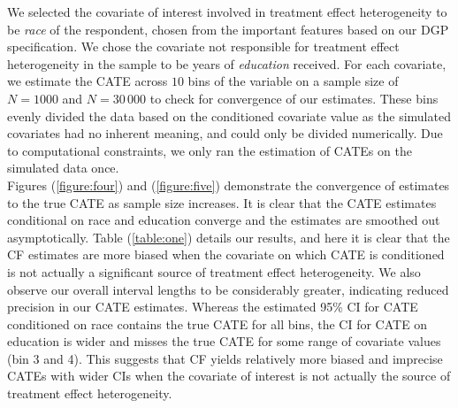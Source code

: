 \documentclass[12pt]{article}
\begin{document}
We selected the covariate of interest involved in treatment effect heterogeneity
to be \textit{race} of the respondent, chosen from the important features based
on our DGP specification. We chose the covariate not responsible for treatment
effect heterogeneity in the sample to be years of \textit{education} received.
For each covariate, we estimate the CATE across $10$ bins of the variable on a
sample size of $N = 1000$ and $N = 30\,000$ to check for convergence of our
estimates. These bins evenly divided the data based on the conditioned covariate value
as the simulated covariates had no inherent meaning, and could only be divided numerically. 
Due to computational constraints, we only ran the estimation of CATEs on the simulated data once. \\ 

Figures (\ref{figure:four}) and (\ref{figure:five}) demonstrate the convergence of estimates to the true CATE as
sample size increases. It is clear that the CATE estimates conditional on race
and education converge and the estimates are smoothed out asymptotically. Table (\ref{table:one}) details our results, and here it is clear that the CF estimates are more
biased when the covariate on which CATE is conditioned is not actually a
significant source of treatment effect heterogeneity. We also observe our
overall interval lengths to be considerably greater, indicating reduced
precision in our CATE estimates. Whereas the estimated 95\% CI for CATE
conditioned on race contains the true CATE for all bins, the CI for CATE on
education is wider and misses the true CATE for some range of covariate values
(bin 3 and 4). This suggests that CF yields relatively more biased and imprecise
CATEs with wider CIs when the covariate of interest is not actually the source
of treatment effect heterogeneity. \\ 
\end{document}
